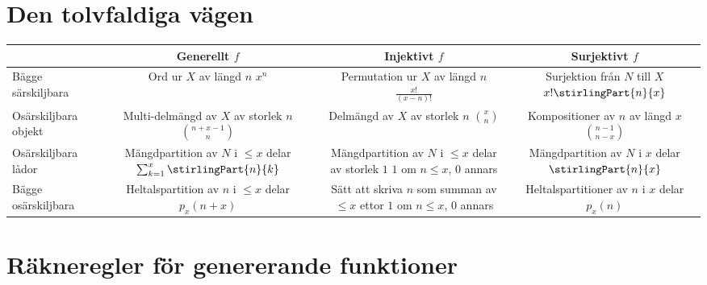 \documentclass[nobib]{tufte-handout}
\begin{document}
\section{Den tolvfaldiga vägen}

\begin{fullwidth}
  \begin{tabularx}{\linewidth}{l|ccc}
    & Generellt $f$ & Injektivt $f$ & Surjektivt $f$\\
    \midrule
    Bägge särskiljbara & \specialcell{Ord ur $X$ av längd $n$\\ $x^n$} & \specialcell{Permutation ur $X$ av längd $n$\\ $\frac{x!}{(x-n)!}$} & \specialcell{Surjektion från $N$ till $X$\\$x!\stirlingPart{n}{x}$} \\
    Osärskiljbara objekt & \specialcell{Multi-delmängd av $X$\\ av storlek $n$\\$\binom{n + x - 1}{n}$} & \specialcell{Delmängd av $X$ av storlek $n$\\$\binom{x}{n}$} & \specialcell{Kompositioner av $n$\\av längd $x$\\$\binom{n - 1}{n - x}$} \\
    Osärskiljbara lådor & \specialcell{Mängdpartition av $N$\\ i $\leq x$ delar \\$\sum_{k=1}^{x} \stirlingPart{n}{k}$} & \specialcell{Mängdpartition av $N$\\ i $\leq x$ delar av storlek $1$\\$1$ om $n \leq x$, $0$ annars} & \specialcell{Mängdpartition av $N$\\i $x$ delar\\$\stirlingPart{n}{x}$} \\
    Bägge osärskiljbara & \specialcell{Heltalspartition av $n$ i $\leq x$ delar\\$p_x(n + x)$} & \specialcell{Sätt att skriva $n$ som\\summan av $\leq x$ ettor\\$1$ om $n \leq x$, $0$ annars} & \specialcell{Heltalspartitioner av $n$\\ i $x$ delar \\$p_x(n)$} 
  \end{tabularx}
\end{fullwidth}

\section{Räkneregler för genererande funktioner}
\end{document}
